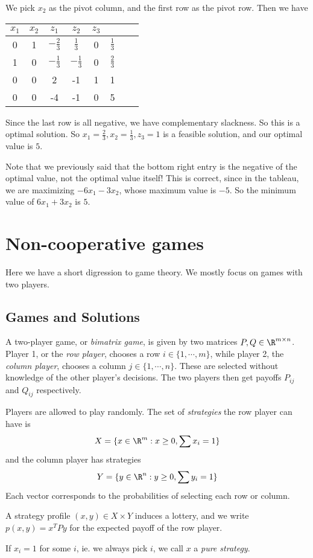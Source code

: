 \documentclass[a4paper]{article}
\begin{document}
\begin{eg}
  We pick $x_2$ as the pivot column, and the first row as the pivot row. Then we have
  \begin{center}
    \begin{tabular}{cccccccc}
      \toprule
      $x_1$ & $x_2$ & $z_1$ & $z_2$ & $z_3$\\
      \midrule
      0 & 1 & $-\frac{2}{3}$ & $\frac{1}{3}$ & 0 & $\frac{1}{3}$\\
      1 & 0 & $-\frac{1}{3}$ & $-\frac{1}{3}$ & 0 & $\frac{2}{3}$\\
      0 & 0 & 2 & -1 & 1 & 1\\
      \midrule
      0 & 0 & -4 & -1 & 0 & 5\\
      \bottomrule
    \end{tabular}
  \end{center}
  Since the last row is all negative, we have complementary slackness. So this is a optimal solution. So $x_1 = \frac{2}{3}, x_2 = \frac{1}{3}, z_3 = 1$ is a feasible solution, and our optimal value is $5$.

  Note that we previously said that the bottom right entry is the negative of the optimal value, not the optimal value itself! This is correct, since in the tableau, we are maximizing $-6x_1 - 3x_2$, whose maximum value is $-5$. So the minimum value of $6x_1 + 3x_2$ is $5$.
\end{eg}
\section{Non-cooperative games}
Here we have a short digression to game theory. We mostly focus on games with two players.

\subsection{Games and Solutions}
\begin{defi}
  A two-player game, or \emph{bimatrix game}, is given by two matrices $P, Q\in \R^{m\times n}$. Player 1, or the \emph{row player}, chooses a row $i\in \{1, \cdots, m\}$, while player 2, the \emph{column player}, chooses a column $j\in \{1, \cdots, n\}$. These are selected without knowledge of the other player's decisions. The two players then get payoffs $P_{ij}$ and $Q_{ij}$ respectively.
\end{defi}

\begin{defi}[Strategy]
  Players are allowed to play randomly. The set of \emph{strategies} the row player can have is
  \[
    X = \{x\in \R^m: x \geq 0, \sum x_i = 1\}
  \]
  and the column player has strategies
  \[
    Y = \{y\in \R^n: y \geq 0, \sum y_i = 1\}
  \]
  Each vector corresponds to the probabilities of selecting each row or column.

  A strategy profile $(x, y)\in X\times Y$ induces a lottery, and we write $p(x, y) = x^T Py$ for the expected payoff of the row player.

  If $x_i = 1$ for some $i$, ie. we always pick $i$, we call $x$ a \emph{pure strategy}.
\end{defi}
\end{document}
